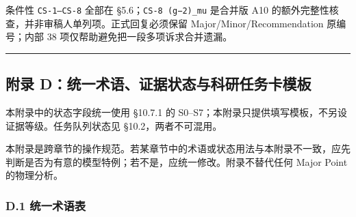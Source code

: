 \documentclass[
  chinese,
  UTF8]{ctexart}
\begin{document}
条件性 \texttt{CS-1–CS-8} 全部在 §5.6；\texttt{CS-8\ (g−2)\_mu} 是合并版
A10 的额外完整性核查，并非审稿人单列项。正式回复必须保留
Major/Minor/Recommendation 原编号；内部 38
项仅帮助避免把一段多项诉求合并遗漏。

\begin{center}\rule{0.5\linewidth}{0.5pt}\end{center}

\subsection{附录
D：统一术语、证据状态与科研任务卡模板}\label{ux9644ux5f55-dux7edfux4e00ux672fux8bedux8bc1ux636eux72b6ux6001ux4e0eux79d1ux7814ux4efbux52a1ux5361ux6a21ux677f}

本附录中的状态字段统一使用 §10.7.1 的
S0--S7；本附录只提供填写模板，不另设证据等级。任务队列状态见
§10.2，两者不可混用。

本附录是跨章节的操作规范。若某章节中的术语或状态用法与本附录不一致，应先判断是否为有意的模型特例；若不是，应统一修改。附录不替代任何
Major Point 的物理分析。

\subsubsection{D.1 统一术语表}\label{d.1-ux7edfux4e00ux672fux8bedux8868}
\end{document}
